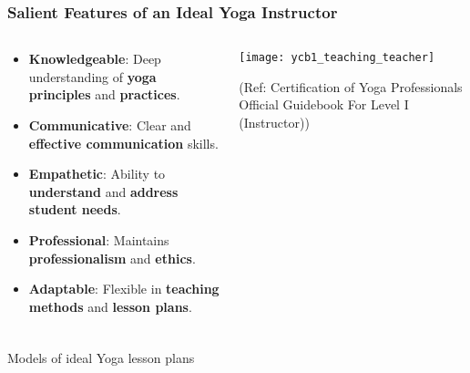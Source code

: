 \begin{frame}[fragile]\frametitle{Salient Features of an Ideal Yoga Instructor}
\begin{columns}
    \begin{column}[T]{0.5\linewidth}
      \begin{itemize}
        \item \textbf{Knowledgeable}: Deep understanding of \textbf{yoga principles} and \textbf{practices}.
        \item \textbf{Communicative}: Clear and \textbf{effective communication} skills.
        \item \textbf{Empathetic}: Ability to \textbf{understand} and \textbf{address student needs}.
        \item \textbf{Professional}: Maintains \textbf{professionalism} and \textbf{ethics}.
        \item \textbf{Adaptable}: Flexible in \textbf{teaching methods} and \textbf{lesson plans}.
      \end{itemize}
    \end{column}
    \begin{column}[T]{0.5\linewidth}
        \begin{center}
        \texttt{[image: ycb1\_teaching\_teacher]}
		
		{\tiny (Ref: Certification  of Yoga Professionals Official Guidebook For Level I (Instructor))}	
        \end{center}	
    \end{column}
\end{columns}
\end{frame}


\begin{frame}[fragile]\frametitle{}
\begin{center}
{\Large Models of ideal Yoga lesson plans}
\end{center}
\end{frame}

